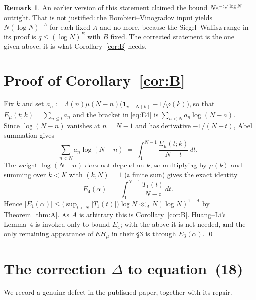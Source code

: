 \documentclass[11pt,a4paper]{article}
\theoremstyle{plain}
\theoremstyle{definition}
\newtheorem{remark}[theorem]{Remark}
\newcommand{\Emu}{E_\mu}
\begin{document}
\begin{remark}\label{rem:bound}
An earlier version of this statement claimed the bound
$Ne^{-c\sqrt{\log N}}$ outright. That is not justified: the
Bombieri--Vinogradov input yields $N(\log N)^{-A}$ for each fixed $A$
and no more, because the Siegel--Walfisz range in its proof is
$q\le(\log N)^{B}$ with $B$ fixed. The corrected statement is the one
given above; it is what Corollary~\ref{cor:B} needs.
\end{remark}

\section{Proof of Corollary~\ref{cor:B}}

Fix $k$ and set
$a_n:=\Lambda(n)\mu(N-n)\bigl(\mathbf 1_{n\equiv N (k)}-1/\varphi(k)\bigr)$,
so that $\Emu(t;k)=\sum_{n\le t}a_n$ and the bracket in \eqref{eq:E4} is
$\sum_{n<N}a_n\log(N-n)$. Since $\log(N-n)$ vanishes at $n=N-1$ and has
derivative $-1/(N-t)$, Abel summation gives
\[
  \sum_{n<N}a_n\log(N-n) \;=\; \int_{1}^{N-1}\frac{\Emu(t;k)}{N-t}\,dt .
\]
The weight $\log(N-n)$ does not depend on $k$, so multiplying by
$\mu(k)$ and summing over $k<K$ with $(k,N)=1$ (a finite sum) gives the
exact identity
\[
  E_4(\alpha) \;=\; \int_{1}^{N-1}\frac{T_1(t)}{N-t}\,dt .
\]
Hence $|E_4(\alpha)|\le\bigl(\sup_{t<N}|T_1(t)|\bigr)\log N
\ll_A N(\log N)^{1-A}$ by Theorem~\ref{thm:A}. As $A$ is arbitrary this
is Corollary~\ref{cor:B}. Huang--Li's Lemma~4 is invoked only to bound
$E_4$; with the above it is not needed, and the only remaining
appearance of $EH_\mu$ in their §3 is through $E_3(\alpha)$. \qed

\section{The correction $\Delta$ to equation~(18)}\label{sec:delta}

We record a genuine defect in the published paper, together with its
repair.
\end{document}
